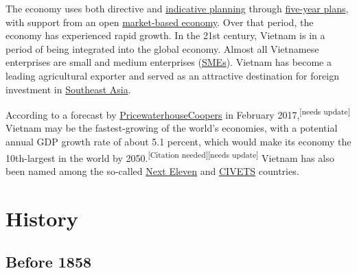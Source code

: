 \documentclass{article}
\begin{document}
The economy uses both directive and \href{https://en.wikipedia.org/wiki/Indicative_planning}{indicative planning} through \href{https://en.wikipedia.org/wiki/Five-Year_Plans_of_Vietnam}{five-year plans}, with support from an open \href{https://en.wikipedia.org/wiki/Market_economy}{market-based economy}. Over that period, the economy has experienced rapid growth. In the 21st century, Vietnam is in a period of being integrated into the global economy. Almost all Vietnamese enterprises are small and medium enterprises (\href{https://en.wikipedia.org/wiki/Small_and_medium_enterprises}{SMEs}). Vietnam has become a leading agricultural exporter and served as an attractive destination for foreign investment in \href{https://en.wikipedia.org/wiki/Southeast_Asia}{Southeast Asia}.

According to a forecast by \href{https://en.wikipedia.org/wiki/PricewaterhouseCoopers}{PricewaterhouseCoopers} in February 2017,\textsuperscript{[needs update]} Vietnam may be the fastest-growing of the world's economies, with a potential annual GDP growth rate of about 5.1 percent, which would make its economy the 10th-largest in the world by 2050.\textsuperscript{[Citation needed][needs update]} Vietnam has also been named among the so-called \href{https://en.wikipedia.org/wiki/Jim_O%27Neill,_Baron_O%27Neill_of_Gatley#Next_Eleven}{Next Eleven} and \href{https://en.wikipedia.org/wiki/CIVETS}{CIVETS} countries.

\section*{History}
\subsection*{Before 1858}
\end{document}
